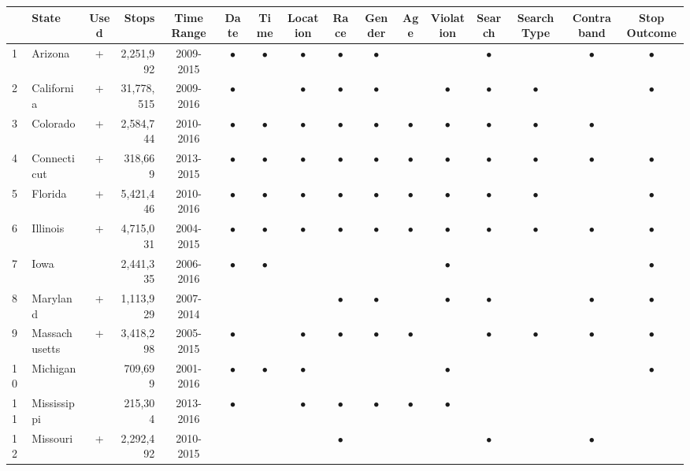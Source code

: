 \begin{table}[ht]
\centering
\begin{tabular}{llcrcccccccccccc}
  \hline
 & State & Used & Stops & Time Range & Date & Time & Location & Race & Gender & Age & Violation & Search & Search Type & Contraband & Stop Outcome \\ 
  \hline
1 & Arizona & + &   2,251,992 & 2009-2015 & $\bullet$ & $\bullet$ & $\bullet$ & $\bullet$ & $\bullet$ &  &  & $\bullet$ &  & $\bullet$ & $\bullet$ \\ 
  2 & California & + &  31,778,515 & 2009-2016 & $\bullet$ &  & $\bullet$ & $\bullet$ & $\bullet$ &  & $\bullet$ & $\bullet$ & $\bullet$ &  & $\bullet$ \\ 
  3 & Colorado & + &   2,584,744 & 2010-2016 & $\bullet$ & $\bullet$ & $\bullet$ & $\bullet$ & $\bullet$ & $\bullet$ & $\bullet$ & $\bullet$ & $\bullet$ & $\bullet$ &  \\ 
  4 & Connecticut & + &     318,669 & 2013-2015 & $\bullet$ & $\bullet$ & $\bullet$ & $\bullet$ & $\bullet$ & $\bullet$ & $\bullet$ & $\bullet$ & $\bullet$ & $\bullet$ & $\bullet$ \\ 
  5 & Florida & + &   5,421,446 & 2010-2016 & $\bullet$ & $\bullet$ & $\bullet$ & $\bullet$ & $\bullet$ & $\bullet$ & $\bullet$ & $\bullet$ & $\bullet$ &  & $\bullet$ \\ 
  6 & Illinois & + &   4,715,031 & 2004-2015 & $\bullet$ & $\bullet$ & $\bullet$ & $\bullet$ & $\bullet$ & $\bullet$ & $\bullet$ & $\bullet$ & $\bullet$ & $\bullet$ & $\bullet$ \\ 
  7 & Iowa &  &   2,441,335 & 2006-2016 & $\bullet$ & $\bullet$ &  &  &  &  & $\bullet$ &  &  &  & $\bullet$ \\ 
  8 & Maryland & + &   1,113,929 & 2007-2014 &  &  &  & $\bullet$ & $\bullet$ &  & $\bullet$ & $\bullet$ &  & $\bullet$ & $\bullet$ \\ 
  9 & Massachusetts & + &   3,418,298 & 2005-2015 & $\bullet$ &  & $\bullet$ & $\bullet$ & $\bullet$ & $\bullet$ &  & $\bullet$ & $\bullet$ & $\bullet$ & $\bullet$ \\ 
  10 & Michigan &  &     709,699 & 2001-2016 & $\bullet$ & $\bullet$ & $\bullet$ &  &  &  & $\bullet$ &  &  &  & $\bullet$ \\ 
  11 & Mississippi &  &     215,304 & 2013-2016 & $\bullet$ &  & $\bullet$ & $\bullet$ & $\bullet$ & $\bullet$ & $\bullet$ &  &  &  &  \\ 
  12 & Missouri & + &   2,292,492 & 2010-2015 &  &  &  & $\bullet$ &  &  &  & $\bullet$ &  & $\bullet$ &  \\ 

\end{tabular}
\end{table}
